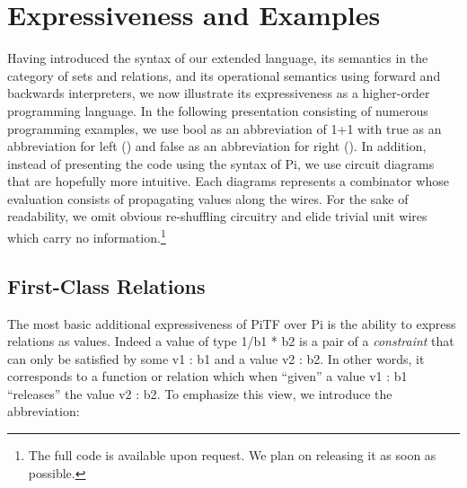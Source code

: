 \documentclass{llncs}
\newcommand{\roshan}[1]{}
\begin{document}


\section{Expressiveness and Examples} 

Having introduced the syntax of our extended language, its semantics in the
category of sets and relations, and its operational semantics using forward
and backwards interpreters, we now illustrate its expressiveness as a
higher-order programming language. In the following presentation consisting
of numerous programming examples, we use {{bool}} as an abbreviation of
{{1+1}} with {{true}} as an abbreviation for {{left ()}} and {{false}} as an
abbreviation for {{right ()}}. In addition, instead of presenting the code
using the syntax of {{Pi}}, we use circuit diagrams that are hopefully more
intuitive. Each diagrams represents a combinator whose evaluation consists of
propagating values along the wires.  For the sake of readability, we omit
obvious re-shuffling circuitry and elide trivial unit wires which carry no
information.\footnote{The full code is available upon request. We plan on
  releasing it as soon as possible.} 

\subsection{First-Class Relations}

The most basic additional expressiveness of {{PiTF}} over {{Pi}} is the
ability to express relations as values. Indeed a value of type {{1/b1 * b2}}
is a pair of a \emph{constraint} that can only be satisfied by some 
{{v1 : b1}} and a value {{v2 : b2}}. In other words, it corresponds to a
function or relation which when ``given'' a value {{v1 : b1}} ``releases''
the value {{v2 : b2}}. To emphasize this view, we introduce the abbreviation:
\end{document}
